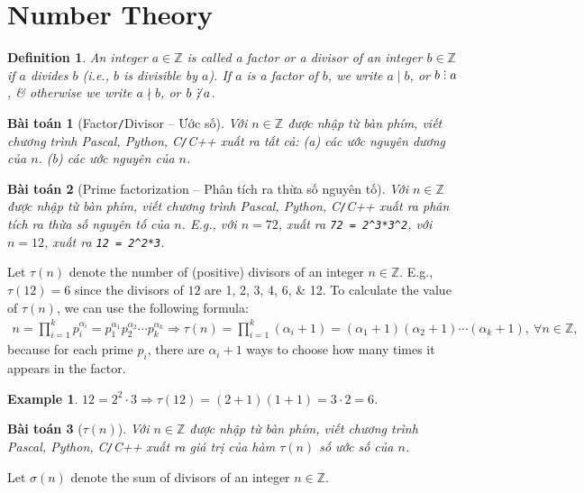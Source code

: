 \documentclass{article}
\newtheorem{baitoan}{Bài toán}
\newtheorem{definition}{Definition}
\newtheorem{example}{Example}
\DeclareRobustCommand{\divby}{%
	\mathrel{\vbox{\baselineskip.65ex\lineskiplimit0pt\hbox{.}\hbox{.}\hbox{.}}}%
}
\begin{document}
\section{Number Theory}

\begin{definition}
	An integer $a\in\mathbb{Z}$ is called a \emph{factor} or a \emph{divisor} of an integer $b\in\mathbb{Z}$ if $a$ divides $b$ (i.e., $b$ is divisible by $a$). If $a$ is a factor of $b$, we write $a\mid b$, or $b\divby a$, \& otherwise we write $a\nmid b$, or $b\not\,\divby a$.
\end{definition}

\begin{baitoan}[Factor\texttt{/}Divisor -- Ước số]
	Với $n\in\mathbb{Z}$ được nhập từ bàn phím, viết chương trình {\sf Pascal, Python, C\texttt{/}C++} xuất ra tất cả: (a) các ước nguyên dương của $n$. (b) các ước nguyên của $n$.
\end{baitoan}

\begin{baitoan}[Prime factorization -- Phân tích ra thừa số nguyên tố]
	Với $n\in\mathbb{Z}$ được nhập từ bàn phím, viết chương trình {\sf Pascal, Python, C\texttt{/}C++} xuất ra phân tích ra thừa số nguyên tố của $n$. E.g., với $n = 72$, xuất ra \verb|72 = 2^3*3^2|, với $n = 12$, xuất ra \verb|12 = 2^2*3|.
\end{baitoan}
Let $\tau(n)$ denote the number of (positive) divisors of an integer $n\in\mathbb{Z}$. E.g., $\tau(12) = 6$ since the divisors of $12$ are 1, 2, 3, 4, 6, \& 12. To calculate the value of $\tau(n)$, we can use the following formula:
\begin{align*}
	n = \prod_{i=1}^k p_i^{\alpha_i} = p_1^{\alpha_1}p_2^{\alpha_2}\cdots p_k^{\alpha_k}\Rightarrow\tau(n) = \prod_{i=1}^k (\alpha_i + 1) = (\alpha_1 + 1)(\alpha_2 + 1)\cdots(\alpha_k + 1),\ \forall n\in\mathbb{Z},
\end{align*}
because for each prime $p_i$, there are $\alpha_i + 1$ ways to choose how many times it appears in the factor.

\begin{example}
	$12 = 2^2\cdot3\Rightarrow\tau(12) = (2 + 1)(1 + 1) = 3\cdot2 = 6$.
\end{example}

\begin{baitoan}[$\tau(n)$]
	Với $n\in\mathbb{Z}$ được nhập từ bàn phím, viết chương trình {\sf Pascal, Python, C\texttt{/}C++} xuất ra giá trị của hàm $\tau(n)$ số ước số của $n$.
\end{baitoan}
Let $\sigma(n)$ denote the sum of divisors of an integer $n\in\mathbb{Z}$.
\end{document}
